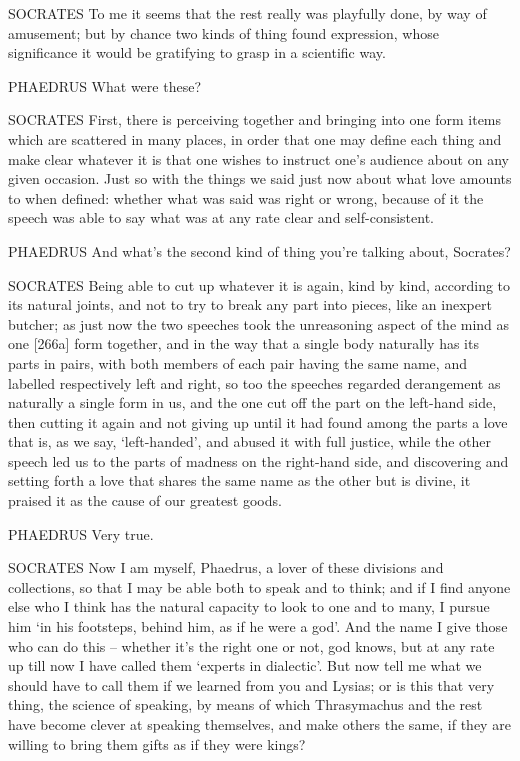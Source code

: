 SOCRATES To me it seems that the rest really was playfully done, by way
of amusement; but by chance two kinds of
thing found expression,
whose significance it would be gratifying to grasp in a scientific way.

PHAEDRUS What were these?

SOCRATES First, there is perceiving together and bringing into one form
items which are scattered in many
places, in order that
one may define each thing and make clear whatever it is  that
one wishes to instruct
one's audience about on any given occasion. Just so with the things we
said just now about what love amounts to when defined: whether what was
said was right or wrong, because of it the
speech was able to say
what was at any rate clear and self-consistent.

PHAEDRUS And what's the second kind of thing you're talking about,
Socrates?

SOCRATES Being able to cut up whatever it is again, kind by
kind, according to its
natural joints, and not to try to break any part into pieces, like an
inexpert butcher; as just now the two speeches took the unreasoning
aspect of the mind as one {[}266a{]} form together, and in the way that
a single body naturally has its parts in pairs, with both members of
each pair having the same name, and labelled respectively left and
right, so too the speeches regarded derangement as naturally a single
form in us, and the one cut off the part on the left-hand side, then
cutting  it again and not giving up until it had found among the
parts a love that is, as we say, ‘left-handed', and abused it with full
justice, while the other speech led us to the parts of madness on the
right-hand side, and discovering and setting forth a love that shares
the same name as the other but is divine, it praised  it as the
cause of our greatest goods.

PHAEDRUS Very true.

SOCRATES Now I am myself, Phaedrus, a lover of these divisions and
collections, so that I may be able both to speak and  to think;
and if I find anyone else who I think has the natural capacity to look
to one and to many, I
pursue him ‘in his footsteps, behind him, as if he were a
god'. And the name I
give those who can do this -- whether it's the right one or not, god
knows, but at any rate
up till now I have called them  ‘experts in
dialectic'. But now tell
me what we should have to call them if we learned from you and Lysias;
or is this that very thing, the science of speaking, by means of which
Thrasymachus and the rest have become clever at speaking themselves, and
make others the same, if they are willing to  bring them gifts
as if they were kings?

